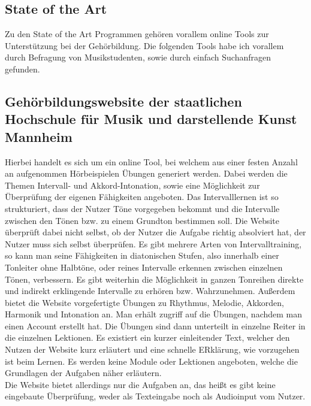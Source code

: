 \subsection{State of the Art}

Zu den State of the Art Programmen gehören vorallem online Tools zur Unterstützung bei der Gehörbildung. Die folgenden Tools habe ich vorallem durch Befragung von Musikstudenten, sowie durch einfach Suchanfragen gefunden.

\subsection*{Gehörbildungswebsite der staatlichen Hochschule für Musik und darstellende Kunst Mannheim}
\label{sec:Mannheim}
Hierbei handelt es sich um ein online Tool, bei welchem aus einer festen Anzahl an aufgenommen Hörbeispielen Übungen generiert werden.
Dabei werden die Themen Intervall- und Akkord-Intonation, sowie eine Möglichkeit zur Überprüfung der eigenen Fähigkeiten angeboten. Das Intervalllernen ist so strukturiert, dass der Nutzer Töne vorgegeben bekommt
und die Intervalle zwischen den Tönen bzw. zu einem Grundton bestimmen soll. Die Website überprüft dabei nicht selbst, ob der Nutzer die Aufgabe richtig absolviert hat, der Nutzer muss sich selbst überprüfen. 
Es gibt mehrere Arten von Intervalltraining, so kann man seine Fähigkeiten in diatonischen Stufen, also innerhalb einer Tonleiter ohne Halbtöne, oder reines Intervalle erkennen zwischen einzelnen Tönen, verbessern. Es gibt weiterhin die Möglichkeit in ganzen Tonreihen
direkte und indirekt erklingende Intervalle zu erhören bzw. Wahrzunehmen. Außerdem bietet die Website vorgefertigte Übungen zu Rhythmus, Melodie, Akkorden, Harmonik und Intonation an. Man erhält zugriff auf die Übungen, nachdem man einen Account 
erstellt hat. Die Übungen sind dann unterteilt in einzelne Reiter in die einzelnen Lektionen. Es existiert ein kurzer einleitender Text, welcher den Nutzen der Website kurz erläutert und eine schnelle ERklärung, wie vorzugehen ist beim Lernen. Es werden keine 
Module oder Lektionen angeboten, welche die Grundlagen der Aufgaben näher erläutern.\\
Die Website bietet allerdings nur die Aufgaben an, das heißt es gibt keine eingebaute Überprüfung, weder als Texteingabe noch als Audioinput vom Nutzer. \cite{hfmdk_mannheim}

